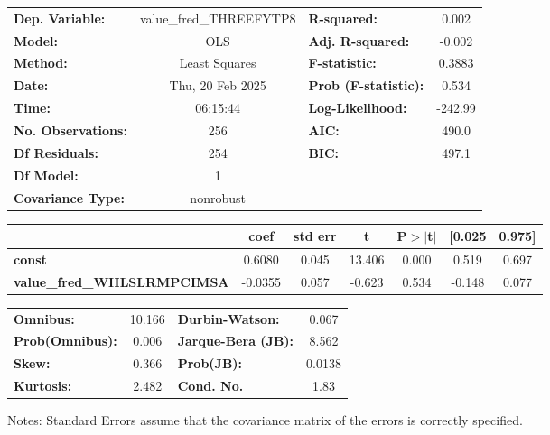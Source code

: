 \begin{center}
\begin{tabular}{lclc}
\toprule
\textbf{Dep. Variable:}             & value\_fred\_THREEFYTP8 & \textbf{  R-squared:         } &     0.002   \\
\textbf{Model:}                     &           OLS           & \textbf{  Adj. R-squared:    } &    -0.002   \\
\textbf{Method:}                    &      Least Squares      & \textbf{  F-statistic:       } &    0.3883   \\
\textbf{Date:}                      &     Thu, 20 Feb 2025    & \textbf{  Prob (F-statistic):} &    0.534    \\
\textbf{Time:}                      &         06:15:44        & \textbf{  Log-Likelihood:    } &   -242.99   \\
\textbf{No. Observations:}          &             256         & \textbf{  AIC:               } &     490.0   \\
\textbf{Df Residuals:}              &             254         & \textbf{  BIC:               } &     497.1   \\
\textbf{Df Model:}                  &               1         & \textbf{                     } &             \\
\textbf{Covariance Type:}           &        nonrobust        & \textbf{                     } &             \\
\bottomrule
\end{tabular}
\begin{tabular}{lcccccc}
                                    & \textbf{coef} & \textbf{std err} & \textbf{t} & \textbf{P$> |$t$|$} & \textbf{[0.025} & \textbf{0.975]}  \\
\midrule
\textbf{const}                      &       0.6080  &        0.045     &    13.406  &         0.000        &        0.519    &        0.697     \\
\textbf{value\_fred\_WHLSLRMPCIMSA} &      -0.0355  &        0.057     &    -0.623  &         0.534        &       -0.148    &        0.077     \\
\bottomrule
\end{tabular}
\begin{tabular}{lclc}
\textbf{Omnibus:}       & 10.166 & \textbf{  Durbin-Watson:     } &    0.067  \\
\textbf{Prob(Omnibus):} &  0.006 & \textbf{  Jarque-Bera (JB):  } &    8.562  \\
\textbf{Skew:}          &  0.366 & \textbf{  Prob(JB):          } &   0.0138  \\
\textbf{Kurtosis:}      &  2.482 & \textbf{  Cond. No.          } &     1.83  \\
\bottomrule
\end{tabular}
\end{center}

Notes: \newline
 [1] Standard Errors assume that the covariance matrix of the errors is correctly specified.
